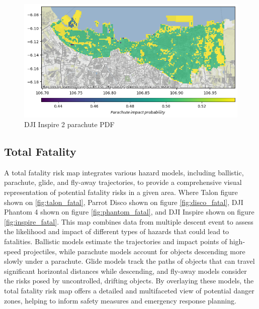 \documentclass[12pt]{report}
\begin{document}
        \begin{figure}[H]
            \centering
            \includegraphics[width=\textwidth]{Plot/inspire/parachute_pdf.png}
            \caption{DJI Inspire 2 parachute PDF}
            \label{fig:inspire_parachute}
        \end{figure}

        \subsection{Total Fatality}


        A total fatality risk map integrates various hazard models, including ballistic, parachute, glide, and fly-away
        trajectories, to provide a comprehensive visual representation of potential fatality risks in a given area.
        Where Talon figure shown on \ref{fig:talon_fatal},  Parrot Disco shown on figure \ref{fig:disco_fatal}, DJI
        Phantom 4 shown on figure \ref{fig:phantom_fatal}, and DJI Inspire shown on figure \ref{fig:inspire_fatal}.
        This map combines data from multiple descent event to assess the likelihood and impact of different types of
        hazards that could lead to fatalities. Ballistic models estimate the trajectories and impact points of
        high-speed projectiles, while parachute models account for objects descending more slowly under a parachute.
        Glide models track the paths of objects that can travel significant horizontal distances while descending, and
        fly-away models consider the risks posed by uncontrolled, drifting objects. By overlaying these models, the
        total fatality risk map offers a detailed and multifaceted view of potential danger zones, helping to inform
        safety measures and emergency response planning.
\end{document}
